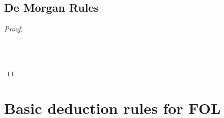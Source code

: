\begin{multicols}{2}
\subsection*{De Morgan Rules}
\begin{proof}

\\	

\\	

\\	
\end{proof}
\end{multicols}

\newpage

\section{Basic deduction rules for FOL}

